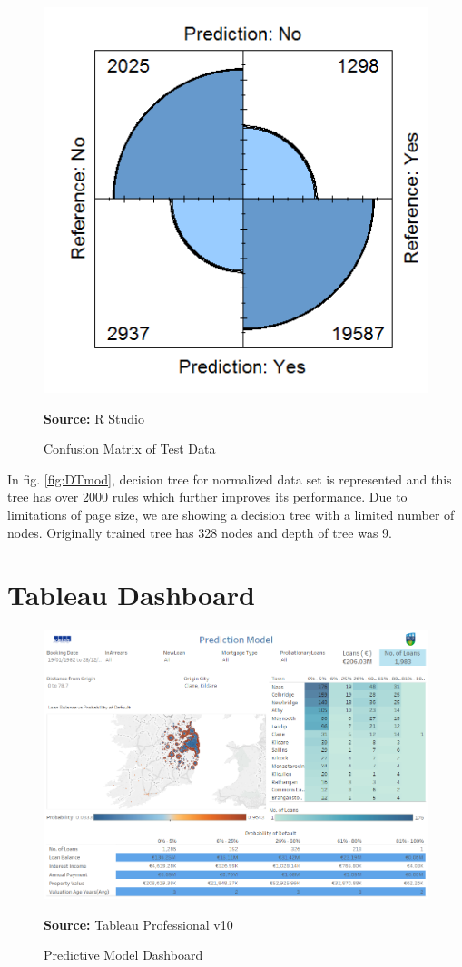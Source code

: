 \begin{center}
\begin{figure}[!htb]
\includegraphics[scale=0.3]{DTcm.png}
\centering
\caption{Confusion Matrix of Test Data}{\textbf{Source:} R Studio}
\label{fig:DTcm}
\end{figure}
\end{center}

In fig. \ref{fig:DTmod}, decision tree for normalized data set is represented and this tree has over 2000 rules which further improves its performance. Due to limitations of page size, we are showing a decision tree with a limited number of nodes. Originally trained tree has 328 nodes and depth of tree was 9. 


\section{Tableau Dashboard}

\begin{center}
\begin{figure}[!htb]
\includegraphics[width=\textwidth]{Predictive.png}
\centering
\caption{Predictive Model Dashboard}{\textbf{Source:} Tableau Professional v10}
\label{fig:overview}
\end{figure}
\end{center}

